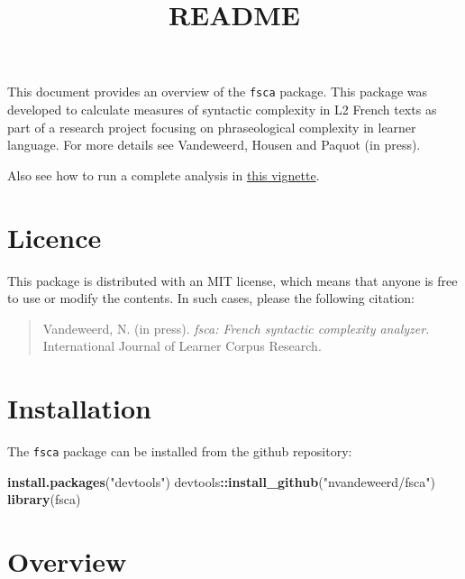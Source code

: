 \documentclass[
]{article}
\title{README}
\author{}
\date{\vspace{-2.5em}}
\newenvironment{Shaded}{\begin{snugshade}}{\end{snugshade}}
\newcommand{\KeywordTok}[1]{\textcolor[rgb]{0.13,0.29,0.53}{\textbf{#1}}}
\newcommand{\NormalTok}[1]{#1}
\newcommand{\OperatorTok}[1]{\textcolor[rgb]{0.81,0.36,0.00}{\textbf{#1}}}
\newcommand{\StringTok}[1]{\textcolor[rgb]{0.31,0.60,0.02}{#1}}
\begin{document}
\maketitle

This document provides an overview of the \texttt{fsca} package. This
package was developed to calculate measures of syntactic complexity in
L2 French texts as part of a research project focusing on phraseological
complexity in learner language. For more details see Vandeweerd, Housen
and Paquot (in press).

Also see how to run a complete analysis in
\href{https://github.com/nvandeweerd/fsca/blob/main/example-analysis.md}{this
vignette}.

\hypertarget{licence}{%
\section{Licence}\label{licence}}

This package is distributed with an MIT license, which means that anyone
is free to use or modify the contents. In such cases, please the
following citation:

\begin{quote}
Vandeweerd, N. (in press). \emph{fsca: French syntactic complexity
analyzer.} International Journal of Learner Corpus Research.
\end{quote}

\hypertarget{installation}{%
\section{Installation}\label{installation}}

The \texttt{fsca} package can be installed from the github repository:

\begin{Shaded}
\begin{Highlighting}[]
\KeywordTok{install.packages}\NormalTok{(}\StringTok{"devtools"}\NormalTok{)}
\NormalTok{devtools}\OperatorTok{::}\KeywordTok{install_github}\NormalTok{(}\StringTok{"nvandeweerd/fsca"}\NormalTok{)}
\KeywordTok{library}\NormalTok{(fsca)}
\end{Highlighting}
\end{Shaded}

\hypertarget{overview}{%
\section{Overview}\label{overview}}
\end{document}

